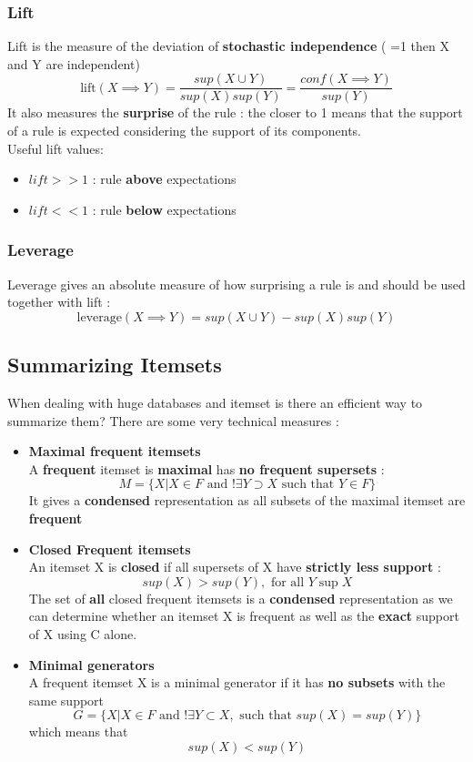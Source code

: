 \subsubsection{Lift}
Lift is the measure of the deviation of \textbf{stochastic independence} ( =1 then X and Y are independent) $$ \text{lift}(X \implies Y) = \frac{sup(X \cup Y)}{sup(X)sup(Y)}= \frac{conf(X \implies Y)}{sup(Y)}$$
It also measures the \textbf{surprise} of the rule : the closer to 1 means that the support of a rule is expected considering the support of its components. \\Useful lift values:
\begin{itemize}
\item $lift >> 1$ : rule \textbf{above} expectations
\item $lift << 1$ : rule \textbf{below} expectations
\end{itemize}

\subsubsection{Leverage}
Leverage gives an absolute measure of how surprising a rule is and should be used together with lift : $$\text{leverage}(X \implies Y )=sup(X \cup Y)-sup(X)sup(Y)$$

\subsection{Summarizing Itemsets}
When dealing with huge databases and itemset is there an efficient way to summarize them? There are some very technical measures :
\begin{itemize}
\item \textbf{Maximal frequent itemsets}\\
A \textbf{frequent} itemset is \textbf{maximal} has \textbf{no frequent supersets} :
$$ M = \{ X |X \in F \text{ and } !\exists Y \supset X \text{ such that } Y \in F \}$$
It gives a \textbf{condensed} representation as all subsets of the maximal itemset
 are \textbf{frequent}
\item \textbf{Closed Frequent itemsets}\\
An itemset X is \textbf{closed} if all supersets of X have \textbf{strictly less support} : 
$$ sup(X) > sup(Y) ,\text{ for all } Y \sup X$$
The set of \textbf{all} closed frequent itemsets is a \textbf{condensed} representation as we can determine whether an itemset X is frequent as well as the \textbf{exact} support of X  using C alone.
\item \textbf{Minimal generators}\\
A frequent itemset X is a minimal generator if it has \textbf{no subsets} with the same support $$ G = \{ X|X \in F \text{ and } !\exists Y \subset X , \text{ such that } sup(X) = sup(Y) \} $$ which means that $$ sup(X) < sup(Y)$$
\end{itemize}

